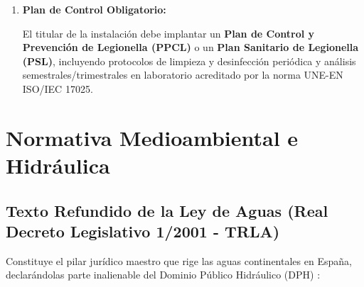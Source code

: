 \documentclass{report}
\begin{document}
\begin{enumerate}
\begin{itemize}
          \end{itemize}

    \item \textbf{Plan de Control Obligatorio:}

          El titular de la instalación debe implantar un \textbf{Plan de Control y Prevención de Legionella (PPCL)} o un \textbf{Plan Sanitario de Legionella (PSL)}, incluyendo protocolos de limpieza y desinfección periódica y análisis semestrales/trimestrales en laboratorio acreditado por la norma UNE-EN ISO/IEC 17025.

\end{enumerate}



\section{Normativa Medioambiental e Hidráulica}



\subsection{Texto Refundido de la Ley de Aguas (Real Decreto Legislativo 1/2001 - TRLA)}

Constituye el pilar jurídico maestro que rige las aguas continentales en España, declarándolas parte inalienable del Dominio Público Hidráulico (DPH) \cite{TRLA2001}:
\end{document}
